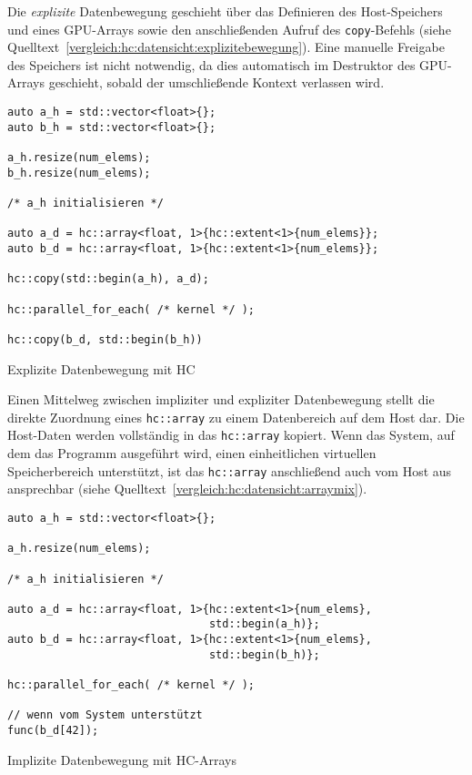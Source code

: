 Die \textit{explizite} Datenbewegung geschieht über das Definieren des
Host-Speichers und eines GPU-Arrays sowie den anschließenden Aufruf des
\texttt{copy}-Befehls (siehe
Quelltext~\ref{vergleich:hc:datensicht:explizitebewegung}). Eine manuelle
Freigabe des Speichers ist nicht notwendig, da dies automatisch im Destruktor
des GPU-Arrays geschieht, sobald der umschließende Kontext verlassen wird.

\begin{code}
    \begin{verbatim}
auto a_h = std::vector<float>{};
auto b_h = std::vector<float>{};

a_h.resize(num_elems);
b_h.resize(num_elems);

/* a_h initialisieren */

auto a_d = hc::array<float, 1>{hc::extent<1>{num_elems}};
auto b_d = hc::array<float, 1>{hc::extent<1>{num_elems}};

hc::copy(std::begin(a_h), a_d);

hc::parallel_for_each( /* kernel */ );

hc::copy(b_d, std::begin(b_h))
    \end{verbatim}
    \caption{Explizite Datenbewegung mit HC}
    \label{vergleich:hc:datensicht:explizitebewegung}
\end{code}

Einen Mittelweg zwischen impliziter und expliziter Datenbewegung stellt die
direkte Zuordnung eines \texttt{hc::array} zu einem Datenbereich auf dem Host
dar. Die Host-Daten werden vollständig in das \texttt{hc::array} kopiert. Wenn
das System, auf dem das Programm ausgeführt wird, einen einheitlichen virtuellen
Speicherbereich unterstützt, ist das \texttt{hc::array} anschließend auch vom
Host aus ansprechbar (siehe Quelltext~\ref{vergleich:hc:datensicht:arraymix}).

\begin{code}
    \begin{verbatim}
auto a_h = std::vector<float>{};

a_h.resize(num_elems);

/* a_h initialisieren */

auto a_d = hc::array<float, 1>{hc::extent<1>{num_elems},
                               std::begin(a_h)};
auto b_d = hc::array<float, 1>{hc::extent<1>{num_elems},
                               std::begin(b_h)};

hc::parallel_for_each( /* kernel */ );

// wenn vom System unterstützt
func(b_d[42]);
    \end{verbatim}
    \caption{Implizite Datenbewegung mit HC-Arrays}
    \label{vergleich:hc:datensicht:arraymix}
\end{code}

